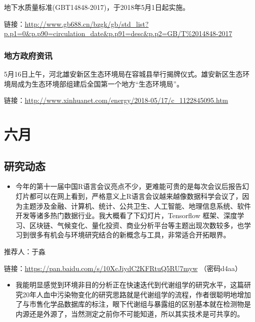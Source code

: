 \documentclass[]{book}
\providecommand{\tightlist}{%
  \setlength{\itemsep}{0pt}\setlength{\parskip}{0pt}}
\begin{document}
地下水质量标准(GBT14848-2017)，于2018年5月1日起实施。

链接：\url{http://www.gb688.cn/bzgk/gb/std_list?p.p1=0\&p.p90=circulation_date\&p.p91=desc\&p.p2=GB/T\%2014848-2017}

\subsubsection*{地方政府资讯}

5月16日上午，河北雄安新区生态环境局在容城县举行揭牌仪式。雄安新区生态环境局成为生态环境部组建后全国第一个地方``生态环境局''。

链接：\url{http://www.xinhuanet.com/energy/2018-05/17/c_1122845095.htm}

\section*{六月}

\subsection*{研究动态}\label{-7}

\begin{itemize}
\tightlist
\item
  今年的第十一届中国R语言会议亮点不少，更难能可贵的是每次会议后报告幻灯片都可以在网上看到，严格意义上R语言会议越来越像数据科学会议了，因为主题涉及金融、计算机、统计、公共卫生、人工智能、地理信息系统、软件开发等诸多热门数据行业。我大概看了下幻灯片，Tensorflow
  框架、深度学习、区块链、气候变化、量化投资、商业分析平台等主题出现次数较多，也学习到很多有机会与环境研究结合的新概念与工具，非常适合开拓眼界。
\end{itemize}

推荐人：于淼

链接：\url{https://pan.baidu.com/s/10XcJiydC2KFRtuQ5RU7myw} （密码d4aa）

\begin{itemize}
\tightlist
\item
  我能明显感觉到环境非目的分析正在快速迭代到代谢组学的研究水平，这篇研究20年人血中污染物变化的研究思路就是代谢组学的流程，作者很聪明地增加了与市售化学品数据库的标注，眼下代谢组与暴露组的区别基本就在检测物是内源还是外源了，当然测定之前你不可能知道，所以其实技术是可共享的。
\end{itemize}
\end{document}
